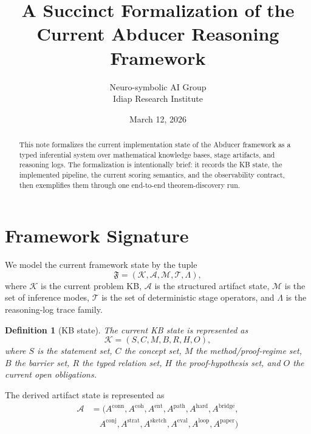 \documentclass[11pt]{article}
\title{A Succinct Formalization of the Current Abducer Reasoning Framework}
\author{Neuro-symbolic AI Group\\Idiap Research Institute}
\date{March 12, 2026}
\newtheorem{definition}{Definition}
\begin{document}
\maketitle
\begin{abstract}
This note formalizes the current implementation state of the Abducer framework as a typed inferential system over mathematical knowledge bases, stage artifacts, and reasoning logs. The formalization is intentionally brief: it records the KB state, the implemented pipeline, the current scoring semantics, and the observability contract, then exemplifies them through one end-to-end theorem-discovery run.
\end{abstract}
\section{Framework Signature}
We model the current framework state by the tuple
\[
\mathfrak{F} = (\mathcal{K}, \mathcal{A}, \mathcal{M}, \mathcal{T}, \Lambda),
\]
where $\mathcal{K}$ is the current problem KB, $\mathcal{A}$ is the structured artifact state, $\mathcal{M}$ is the set of inference modes, $\mathcal{T}$ is the set of deterministic stage operators, and $\Lambda$ is the reasoning-log trace family.
\begin{definition}[KB state]
The current KB state is represented as
\[
\mathcal{K} = (S, C, M, B, R, H, O),
\]
where $S$ is the statement set, $C$ the concept set, $M$ the method/proof-regime set, $B$ the barrier set, $R$ the typed relation set, $H$ the proof-hypothesis set, and $O$ the current open obligations.
\end{definition}
The derived artifact state is represented as
\[
\begin{aligned}
\mathcal{A} &= (A^{\mathrm{conn}}, A^{\mathrm{coh}}, A^{\mathrm{ent}}, A^{\mathrm{path}}, A^{\mathrm{hard}}, A^{\mathrm{bridge}},\\
&\quad A^{\mathrm{conj}}, A^{\mathrm{strat}}, A^{\mathrm{sketch}}, A^{\mathrm{eval}}, A^{\mathrm{loop}}, A^{\mathrm{paper}})
\end{aligned}
\]
\end{document}
